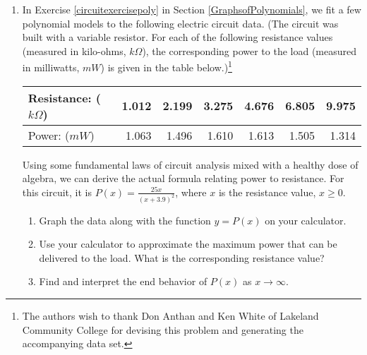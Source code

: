\begin{enumerate}
\begin{enumerate}
\end{enumerate}

\item In Exercise \ref{circuitexercisepoly} in Section \ref{GraphsofPolynomials}, we fit a few polynomial models to the following electric circuit data. (The circuit was built with a variable resistor.  For each of the following resistance values (measured in kilo-ohms, $k \Omega$),  the corresponding power to the load (measured in milliwatts, $mW$) is given in the table below.)\footnote{The authors wish to thank Don Anthan and Ken White of Lakeland Community College for devising this problem and generating the accompanying data set.}


\smallskip

\noindent \begin{tabular}{|l|r|r|r|r|r|r|} \hline
Resistance: ($k \Omega$) & 1.012 & 2.199 & 3.275 & 4.676 & 6.805 & 9.975 \\ \hline
Power: ($mW$) & 1.063 & 1.496 & 1.610 & 1.613 & 1.505 & 1.314 \\ \hline
\end{tabular}

\smallskip

\noindent Using some fundamental laws of circuit analysis mixed with a healthy dose of algebra, we can derive the actual formula relating power to resistance.  For this circuit, it is $P(x) = \frac{25x}{(x + 3.9)^2}$, where $x$ is the resistance value, $x \geq 0$.

\begin{enumerate}

\item Graph the data along with the function $y = P(x)$ on your calculator.

\item Use your calculator to approximate the maximum power that can be delivered to the load.  What is the corresponding resistance value?

\item Find and interpret the end behavior of $P(x)$ as $x \rightarrow \infty$.

\end{enumerate}


\end{enumerate}
